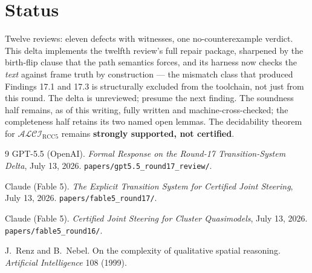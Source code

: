 \documentclass[11pt]{article}
\theoremstyle{definition}
\newcommand{\ALCIRCC}{\mathcal{ALCI}_{\mathrm{RCC5}}}
\newcommand{\code}[1]{\texttt{#1}}
\begin{document}
\section{Status}

Twelve reviews: eleven defects with witnesses, one no-counterexample
verdict.  This delta implements the twelfth review's full repair
package, sharpened by the birth-flip clause that the path semantics
forces, and its harness now checks the \emph{text} against frame truth
by construction --- the mismatch class that produced Findings 17.1 and
17.3 is structurally excluded from the toolchain, not just from this
round.  The delta is unreviewed; presume the next finding.  The
soundness half remains, as of this writing, fully written and
machine-cross-checked; the completeness half retains its two named open
lemmas.  The decidability theorem for $\ALCIRCC$ remains
\textbf{strongly supported, not certified}.

\begin{thebibliography}{9}
 GPT-5.5 (OpenAI).  \emph{Formal Response on the
Round-17 Transition-System Delta}, July 13, 2026.
\code{papers/gpt5.5\_round17\_review/}.

 Claude (Fable 5).  \emph{The Explicit Transition
System for Certified Joint Steering}, July 13, 2026.
\code{papers/fable5\_round17/}.

 Claude (Fable 5).  \emph{Certified Joint Steering for
Cluster Quasimodels}, July 13, 2026.  \code{papers/fable5\_round16/}.

 J.~Renz and B.~Nebel.  On the complexity of
qualitative spatial reasoning.  \emph{Artificial Intelligence} 108
(1999).
\end{thebibliography}
\end{document}
